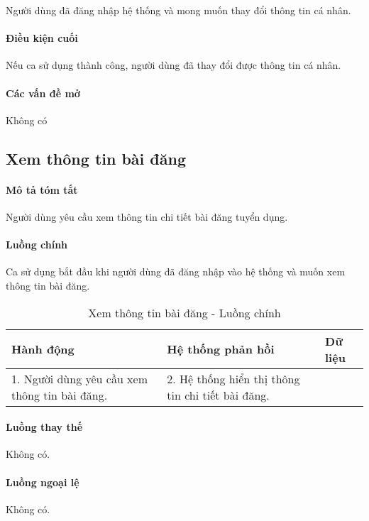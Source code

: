 \documentclass[./../main.tex]{subfiles}
\begin{document}
Người dùng đã đăng nhập hệ thống và mong muốn thay đổi thông tin cá
nhân.

\paragraph*{Điều kiện cuối}

Nếu ca sử dụng thành công, người dùng đã thay đổi được thông tin cá
nhân.

\paragraph*{Các vấn đề mở}

Không có

\subsection{Xem thông tin bài đăng}

\paragraph*{Mô tả tóm tắt}

Người dùng yêu cầu xem thông tin chi tiết bài đăng tuyển dụng.

\paragraph*{Luồng chính} Ca sử dụng bắt đầu khi người dùng đã đăng nhập vào
hệ thống và muốn xem thông tin bài đăng.

\begin{table}[H]
  \caption{Xem thông tin bài đăng - Luồng chính}
  \label{tab:read_post}
  \begin{tabularx}{\textwidth}{|X|X|X|}
  \hline
  \textbf{Hành động}                         & \textbf{Hệ thống phản hồi}                        & \textbf{Dữ liệu} \\ \hline
  1. Người dùng yêu cầu xem thông tin bài đăng. & 2. Hệ thống hiển thị thông tin chi tiết bài đăng. &                  \\ \hline
  \end{tabularx}
\end{table}

\paragraph*{Luồng thay thế} Không có.

\paragraph*{Luồng ngoại lệ} Không có.
\end{document}

